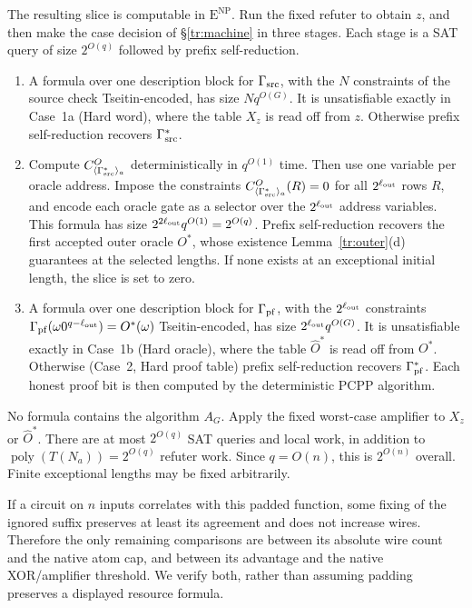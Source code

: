 \documentclass[11pt,letterpaper]{article}
\theoremstyle{definition}
\theoremstyle{remark}
\begin{document}
The resulting slice is computable in $\mathrm E^{\mathrm{NP}}$.
Run the fixed refuter to obtain $z$, and then make the case decision of
\S\ref{tr:machine} in three stages. Each stage is a SAT query of size
$2^{O(q)}$ followed by prefix self-reduction.
\begin{enumerate}[label=(\arabic*)]
\item A formula over one description block for $\Gamma_{\rm src}$, with
the $N$ constraints of the source check Tseitin-encoded, has size
$Nq^{O(G)}$. It is unsatisfiable exactly in Case~1a (Hard word), where
the table $X_z$ is read off from $z$. Otherwise prefix self-reduction
recovers $\Gamma^*_{\rm src}$.

\item Compute $C^O_{\langle\Gamma^*_{\rm src}\rangle_a}$
deterministically in $q^{O(1)}$ time. Then use one variable per oracle
address. Impose the constraints
$C^O_{\langle\Gamma^*_{\rm src}\rangle_a}(R)=0$ for all
$2^{\ell_{\rm out}}$ rows $R$, and encode each oracle gate as a selector
over the $2^{\ell_{\rm out}}$ address variables. This formula has size
$2^{2\ell_{\rm out}}q^{O(1)}=2^{O(q)}$. Prefix self-reduction recovers
the first accepted outer oracle $O^*$, whose existence
Lemma~\ref{tr:outer}(d) guarantees at the selected lengths. If none
exists at an exceptional initial length, the slice is set to zero.

\item A formula over one description block for $\Gamma_{\rm pf}$, with
the $2^{\ell_{\rm out}}$ constraints
$\Gamma_{\rm pf}(\omega0^{q-\ell_{\rm out}})=O^*(\omega)$
Tseitin-encoded, has size $2^{\ell_{\rm out}}q^{O(G)}$. It is
unsatisfiable exactly in Case~1b (Hard oracle), where the table
$\widehat O^*$ is read off from $O^*$. Otherwise (Case~2, Hard proof
table) prefix self-reduction recovers $\Gamma^*_{\rm pf}$. Each honest
proof bit is then computed by the deterministic PCPP algorithm.
\end{enumerate}
No formula contains the algorithm $A_G$.
Apply the fixed worst-case amplifier to $X_z$ or $\widehat O^*$.
There are at most $2^{O(q)}$ SAT queries and local work, in addition
to $\operatorname{poly}(T(N_a))=2^{O(q)}$ refuter work. Since $q=O(n)$,
this is $2^{O(n)}$ overall. Finite exceptional lengths may be fixed
arbitrarily.

If a circuit on $n$ inputs correlates with this padded function, some
fixing of the ignored suffix preserves at least its agreement and
does not increase wires. Therefore the only remaining comparisons are
between its absolute wire count and the native atom cap, and between
its advantage and the native XOR/amplifier threshold. We verify both,
rather than assuming padding preserves a displayed resource formula.
\end{document}

